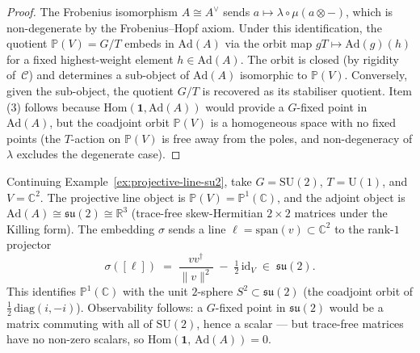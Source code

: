 \begin{proof}
The Frobenius isomorphism $A \cong A^{\vee}$ sends $a \mapsto \lambda \circ
\mu(a \otimes -)$, which is non-degenerate by the Frobenius--Hopf axiom.
Under this identification, the quotient $\mathbb{P}(V) = G/T$ embeds
in $\mathrm{Ad}(A)$ via the orbit map $gT \mapsto \mathrm{Ad}(g)(h)$ for a
fixed highest-weight element $h \in \mathrm{Ad}(A)$.  The orbit is closed
(by rigidity of~$\mathcal{C}$) and determines a sub-object of
$\mathrm{Ad}(A)$ isomorphic to $\mathbb{P}(V)$.  Conversely, given the
sub-object, the quotient $G/T$ is recovered as its stabiliser quotient.  Item
(3) follows because $\mathrm{Hom}(\mathbf{1}, \mathrm{Ad}(A))$ would provide
a $G$-fixed point in $\mathrm{Ad}(A)$, but the coadjoint orbit
$\mathbb{P}(V)$ is a homogeneous space with no fixed points (the $T$-action
on $\mathbb{P}(V)$ is free away from the poles, and non-degeneracy of
$\lambda$ excludes the degenerate case).
\end{proof}

\begin{example}
\label{ex:fiber-adjoint-su2}
Continuing Example~\ref{ex:projective-line-su2}, take
$G = \mathrm{SU}(2)$, $T = \mathrm{U}(1)$, and
$V = \mathbb{C}^2$.  The projective line object is
$\mathbb{P}(V) = \mathbb{P}^1(\mathbb{C})$, and the adjoint object is
$\mathrm{Ad}(A) \cong \mathfrak{su}(2) \cong \mathbb{R}^3$
(trace-free skew-Hermitian $2 \times 2$ matrices under the Killing
form).  The embedding $\sigma$ sends a line
$\ell = \mathrm{span}(v) \subset \mathbb{C}^2$ to the rank-$1$
projector
\[
  \sigma([\ell]) \;=\;
  \frac{v v^{\dagger}}{\lVert v \rVert^2}
  \;-\; \tfrac{1}{2}\,\mathrm{id}_V
  \;\in\; \mathfrak{su}(2).
\]
This identifies $\mathbb{P}^1(\mathbb{C})$ with the unit $2$-sphere
$S^2 \subset \mathfrak{su}(2)$ (the coadjoint orbit of
$\tfrac{1}{2}\,\mathrm{diag}(i, -i)$).  Observability follows:
a $G$-fixed point in $\mathfrak{su}(2)$ would be a matrix commuting
with all of $\mathrm{SU}(2)$, hence a scalar --- but trace-free matrices
have no non-zero scalars, so
$\mathrm{Hom}(\mathbf{1},\, \mathrm{Ad}(A)) = 0$.
\end{example}

